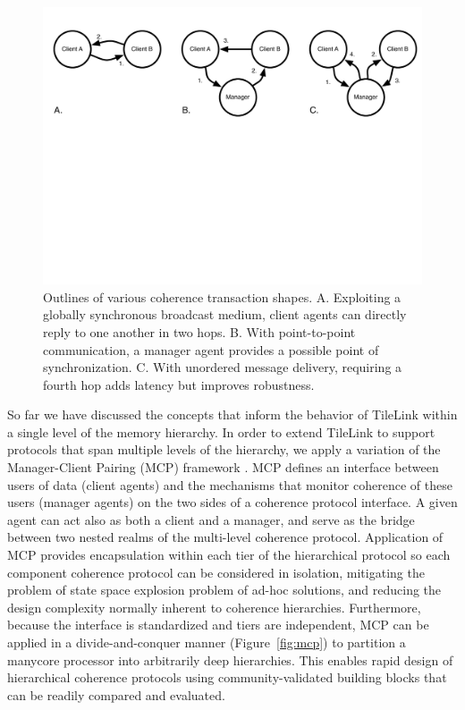 \begin{figure}[t!]
\centering
\includegraphics[width=1\columnwidth]{tilelink/figures/hops.pdf}
\caption{Outlines of various coherence transaction shapes.
A. Exploiting a globally synchronous broadcast medium, client agents can directly reply to one another in two hops.
B. With point-to-point communication, a manager agent provides a possible point of synchronization.
C. With unordered message delivery, requiring a fourth hop adds latency but improves robustness.
}
\label{fig:hops}
\end{figure}

So far we have discussed the concepts that inform the behavior of TileLink within a single level of the memory hierarchy.
In order to extend TileLink to support protocols that span multiple levels of the hierarchy, we apply a variation of the Manager-Client Pairing (MCP) framework \cite{beu2011manager}.
MCP defines an interface between users of data (client agents) and the mechanisms that monitor coherence of these users (manager agents) on the two sides of a coherence protocol interface.
A given agent can act also as both a client and a manager, and serve as the bridge between two nested realms of the multi-level coherence protocol.
Application of MCP provides
encapsulation within each tier of the hierarchical protocol so each
component coherence protocol can be considered in isolation,
mitigating the problem of state space explosion problem of ad-hoc
solutions, and reducing the design complexity normally inherent
to coherence hierarchies. Furthermore, because the interface is
standardized and tiers are independent, MCP can be applied in a
divide-and-conquer manner (Figure~\ref{fig:mcp}) to partition a manycore
processor into arbitrarily deep hierarchies. This enables rapid
design of hierarchical coherence protocols using community-validated
building blocks that can be readily compared and evaluated. 

